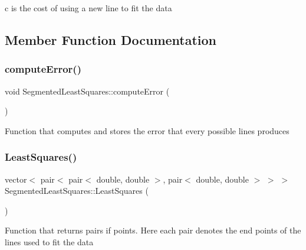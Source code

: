 \textquotesingle{}c\textquotesingle{} is the cost of using a new line to fit the data 

\subsection{Member Function Documentation}
\mbox{\label{classSegmentedLeastSquares_afeded48faee42484d3b5b82dd166121d}} 
\subsubsection{\texorpdfstring{compute\+Error()}{computeError()}}
{\footnotesize\ttfamily void Segmented\+Least\+Squares\+::compute\+Error (\begin{DoxyParamCaption}{ }\end{DoxyParamCaption})\hspace{0.3cm}{\ttfamily [private]}}

Function that computes and stores the error that every possible lines produces \mbox{\label{classSegmentedLeastSquares_af68a3f8b393debbd4926eba0a716cf40}} 
\subsubsection{\texorpdfstring{Least\+Squares()}{LeastSquares()}}
{\footnotesize\ttfamily vector$<$ pair$<$ pair$<$ double, double $>$, pair$<$ double, double $>$ $>$ $>$ Segmented\+Least\+Squares\+::\+Least\+Squares (\begin{DoxyParamCaption}{ }\end{DoxyParamCaption})}

Function that returns pairs if points. Here each pair denotes the end points of the lines used to fit the data \mbox{\label{classSegmentedLeastSquares_a3e716cac8bd4276cf7c1a382a40cb283}} 
